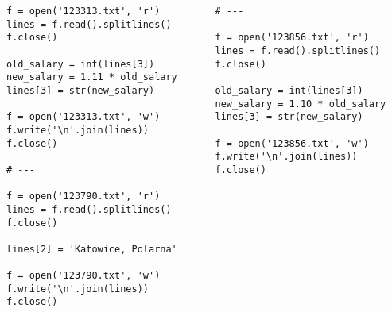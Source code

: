 \documentclass[aspectratio=169]{beamer}
\newcommand{\style}[1]{\ttfamily#1}
\begin{document}
\begin{frame}[fragile]
\begin{columns}
\begin{column}{0.5\textwidth}
\begin{lstlisting}[basicstyle=\style{\tiny}]
f = open('123313.txt', 'r')
lines = f.read().splitlines()
f.close()

old_salary = int(lines[3])
new_salary = 1.11 * old_salary
lines[3] = str(new_salary)

f = open('123313.txt', 'w')
f.write('\n'.join(lines))
f.close()

# ---

f = open('123790.txt', 'r')
lines = f.read().splitlines()
f.close()

lines[2] = 'Katowice, Polarna'

f = open('123790.txt', 'w')
f.write('\n'.join(lines))
f.close()
\end{lstlisting}
\end{column}
\begin{column}{0.5\textwidth}
\begin{lstlisting}[basicstyle=\style{\tiny}]
# ---

f = open('123856.txt', 'r')
lines = f.read().splitlines()
f.close()

old_salary = int(lines[3])
new_salary = 1.10 * old_salary
lines[3] = str(new_salary)

f = open('123856.txt', 'w')
f.write('\n'.join(lines))
f.close()
\end{lstlisting}
\end{column}
\end{columns}
\end{frame}
\end{document}
